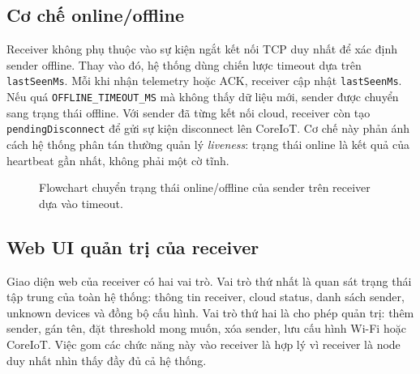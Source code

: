 \documentclass[12pt,a4paper]{report}
\newcommand{\codedata}[1]{{\textcolor{diagramdata}{\texttt{#1}}}}
\begin{document}
\subsection{Cơ chế online/offline}
Receiver không phụ thuộc vào sự kiện ngắt kết nối TCP duy nhất để xác định sender offline. Thay vào đó, hệ thống dùng chiến lược timeout dựa trên \texttt{lastSeenMs}. Mỗi khi nhận telemetry hoặc ACK, receiver cập nhật \texttt{lastSeenMs}. Nếu quá \texttt{OFFLINE\_TIMEOUT\_MS} mà không thấy dữ liệu mới, sender được chuyển sang trạng thái offline. Với sender đã từng kết nối cloud, receiver còn tạo \texttt{pendingDisconnect} để gửi sự kiện disconnect lên CoreIoT. Cơ chế này phản ánh cách hệ thống phân tán thường quản lý \textit{liveness}: trạng thái online là kết quả của heartbeat gần nhất, không phải một cờ tĩnh.

\begin{figure}[H]
\centering
{}
\caption{Flowchart chuyển trạng thái online/offline của sender trên receiver dựa vào timeout.}
\label{fig:offline}
\end{figure}

\subsection{Web UI quản trị của receiver}
Giao diện web của receiver có hai vai trò. Vai trò thứ nhất là quan sát trạng thái tập trung của toàn hệ thống: thông tin receiver, cloud status, danh sách sender, unknown devices và đồng bộ cấu hình. Vai trò thứ hai là cho phép quản trị: thêm sender, gán tên, đặt threshold mong muốn, xóa sender, lưu cấu hình Wi-Fi hoặc CoreIoT. Việc gom các chức năng này vào receiver là hợp lý vì receiver là node duy nhất nhìn thấy đầy đủ cả hệ thống.
\end{document}
